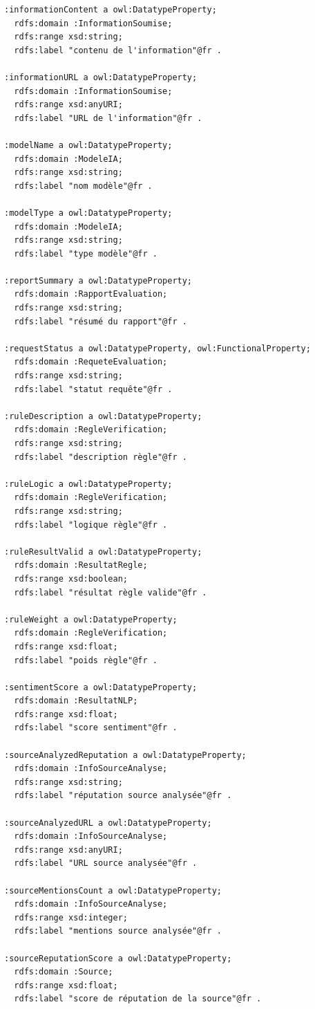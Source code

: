 \documentclass[9pt,twocolumn,french]{article}
\begin{document}
\begin{lstlisting}[language=Turtle,basicstyle=\ttfamily\tiny,frame=single]
:informationContent a owl:DatatypeProperty;
  rdfs:domain :InformationSoumise;
  rdfs:range xsd:string;
  rdfs:label "contenu de l'information"@fr .

:informationURL a owl:DatatypeProperty;
  rdfs:domain :InformationSoumise;
  rdfs:range xsd:anyURI;
  rdfs:label "URL de l'information"@fr .

:modelName a owl:DatatypeProperty;
  rdfs:domain :ModeleIA;
  rdfs:range xsd:string;
  rdfs:label "nom modèle"@fr .

:modelType a owl:DatatypeProperty;
  rdfs:domain :ModeleIA;
  rdfs:range xsd:string;
  rdfs:label "type modèle"@fr .

:reportSummary a owl:DatatypeProperty;
  rdfs:domain :RapportEvaluation;
  rdfs:range xsd:string;
  rdfs:label "résumé du rapport"@fr .

:requestStatus a owl:DatatypeProperty, owl:FunctionalProperty;
  rdfs:domain :RequeteEvaluation;
  rdfs:range xsd:string;
  rdfs:label "statut requête"@fr .

:ruleDescription a owl:DatatypeProperty;
  rdfs:domain :RegleVerification;
  rdfs:range xsd:string;
  rdfs:label "description règle"@fr .

:ruleLogic a owl:DatatypeProperty;
  rdfs:domain :RegleVerification;
  rdfs:range xsd:string;
  rdfs:label "logique règle"@fr .

:ruleResultValid a owl:DatatypeProperty;
  rdfs:domain :ResultatRegle;
  rdfs:range xsd:boolean;
  rdfs:label "résultat règle valide"@fr .

:ruleWeight a owl:DatatypeProperty;
  rdfs:domain :RegleVerification;
  rdfs:range xsd:float;
  rdfs:label "poids règle"@fr .

:sentimentScore a owl:DatatypeProperty;
  rdfs:domain :ResultatNLP;
  rdfs:range xsd:float;
  rdfs:label "score sentiment"@fr .

:sourceAnalyzedReputation a owl:DatatypeProperty;
  rdfs:domain :InfoSourceAnalyse;
  rdfs:range xsd:string;
  rdfs:label "réputation source analysée"@fr .

:sourceAnalyzedURL a owl:DatatypeProperty;
  rdfs:domain :InfoSourceAnalyse;
  rdfs:range xsd:anyURI;
  rdfs:label "URL source analysée"@fr .

:sourceMentionsCount a owl:DatatypeProperty;
  rdfs:domain :InfoSourceAnalyse;
  rdfs:range xsd:integer;
  rdfs:label "mentions source analysée"@fr .

:sourceReputationScore a owl:DatatypeProperty;
  rdfs:domain :Source;
  rdfs:range xsd:float;
  rdfs:label "score de réputation de la source"@fr .


\end{lstlisting}
\end{document}
